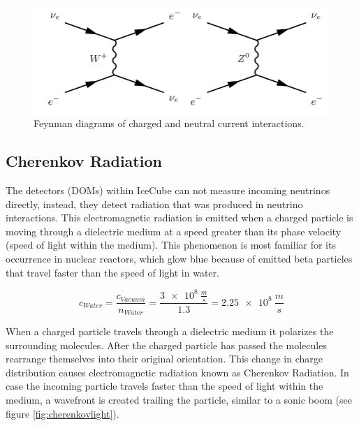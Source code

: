\documentclass[a4paper,10pt]{scrartcl}
\begin{document}
\begin{figure}[h]
    \includegraphics[scale=0.3]{images/charged-and-neutral-current.png}
    \centering
    \caption{Feynman diagrams of charged and neutral current interactions.}
    \label{fig:cc-nc}
\end{figure}


\subsection{Cherenkov Radiation}

The detectors (DOMs) within IceCube can not measure incoming neutrinos directly, instead, they detect radiation that was produced in neutrino interactions.
This electromagnetic radiation is emitted when a charged particle is moving through a dielectric medium at a speed greater than its phase velocity (speed of light within the medium).
This phenomenon is most familiar for its occurrence in nuclear reactors, which glow blue because of emitted beta particles that travel faster than the speed of light in water.

\begin{equation}
    c_{Water} = \frac{c_{Vacuum}}{n_{Water}} = \frac{\SI{3e8}{\frac{m}{s}}}{1.3} = \SI{2.25e8}{\frac{m}{s}}
\end{equation}

When a charged particle travels through a dielectric medium it polarizes the surrounding molecules.
After the charged particle has passed the molecules rearrange themselves into their original orientation.
This change in charge distribution causes electromagnetic radiation known as Cherenkov Radiation.
In case the incoming particle travels faster than the speed of light within the medium, a wavefront is created trailing the particle, similar to a sonic boom (see figure \ref{fig:cherenkovlight}).
\end{document}

